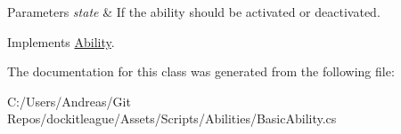 \begin{DoxyParams}{Parameters}
{\em state} & If the ability should be activated or deactivated.\\
\hline
\end{DoxyParams}


Implements \hyperlink{class_ability_a10f7f3c2b63eeef6e352aee48d246384}{Ability}.



The documentation for this class was generated from the following file\+:\begin{DoxyCompactItemize}
\item 
C\+:/\+Users/\+Andreas/\+Git Repos/dockitleague/\+Assets/\+Scripts/\+Abilities/Basic\+Ability.\+cs\end{DoxyCompactItemize}
